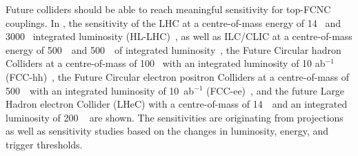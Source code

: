 Future colliders should be able to reach meaningful sensitivity for top-FCNC couplings. In , the sensitivity of the LHC at a centre-of-mass energy of 14 \TeV\ and 3000 \fbinv\ integrated luminosity (HL-LHC)~\cite{Agashe:2013hma}, as well as ILC/CLIC at a centre-of-mass energy of 500~\GeV\ and 500~\fbinv\ of integrated luminosity~\cite{Mangano:2016jyj}, the  Future Circular hadron Colliders at a centre-of-mass of 100 \TeV\ with an integrated luminosity of 10 ab$^{-1}$ (FCC-hh)~\cite{Agashe:2013hma}, the Future Circular electron positron Colliders at a centre-of-mass of 500~\GeV\ with an integrated luminosity of 10~ab$^{-1}$ (FCC-ee)~\cite{Khanpour:2014xla}, and the future Large Hadron electron Collider (LHeC) with a centre-of-mass of 14~\TeV\ and an integrated luminosity of 200 \fbinv~\cite{Liu:2015kkp} are shown. The sensitivities are originating from projections as well as sensitivity studies based on the changes in luminosity, energy, and trigger thresholds. 

